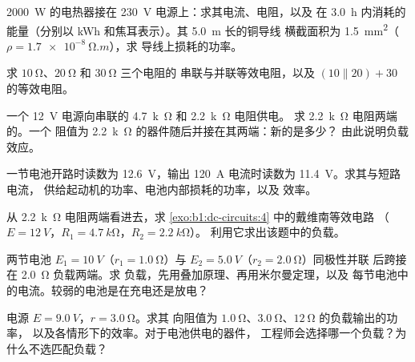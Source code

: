 \begin{exercise}[$\star$]\label{exo:b1:dc-circuits:2}
\qty{2000}{W} 的电热器接在 \qty{230}{V} 电源上：求其电流、电阻，以及
在 \qty{3.0}{h} 内消耗的能量（分别以 kWh 和焦耳表示）。其 \qty{5.0}{m} 长的铜导线
横截面积为 \qty{1.5}{mm^2}（$\rho = \qty{1.7e-8}{\ohm.m}$），求
导线上损耗的功率。
\end{exercise}

\begin{exercise}[$\star$]\label{exo:b1:dc-circuits:3}
求 $\qty{10}{\ohm}$、$\qty{20}{\ohm}$ 和 $\qty{30}{\ohm}$ 三个电阻的
串联与并联等效电阻，以及
$(10 \parallel 20) + 30$ 的等效电阻。
\end{exercise}

\begin{exercise}[$\star$]\label{exo:b1:dc-circuits:4}
一个 \qty{12}{V} 电源向串联的 \qty{4.7}{k\ohm} 和 \qty{2.2}{k\ohm} 电阻供电。
求 \qty{2.2}{k\ohm} 电阻两端的。一个
阻值为 \qty{2.2}{k\ohm} 的器件随后并接在其两端：新的是多少？
由此说明负载效应。
\end{exercise}

\begin{exercise}[$\star\star$]\label{exo:b1:dc-circuits:5}
一节电池开路时读数为 \qty{12.6}{V}，输出
\qty{120}{A} 电流时读数为 \qty{11.4}{V}。求其与短路电流，
供给起动机的功率、电池内部损耗的功率，以及
效率。
\end{exercise}

\begin{exercise}[$\star\star$]\label{exo:b1:dc-circuits:6}
从 \qty{2.2}{k\ohm} 电阻两端看进去，求
\cref{exo:b1:dc-circuits:4} 中的戴维南等效电路
（$E = \qty{12}{V}$，$R_1 = \qty{4.7}{k\ohm}$，$R_2 = \qty{2.2}{k\ohm}$）。
利用它求出该题中的负载。
\end{exercise}

\begin{exercise}[$\star\star$]\label{exo:b1:dc-circuits:7}
两节电池 $E_1 = \qty{10}{V}$（$r_1 = \qty{1.0}{\ohm}$）与
$E_2 = \qty{5.0}{V}$（$r_2 = \qty{2.0}{\ohm}$）同极性并联
后跨接在 \qty{2.0}{\ohm} 负载两端。求
负载，先用叠加原理、再用米尔曼定理，以及
每节电池中的电流。较弱的电池是在充电还是放电？
\end{exercise}

\begin{exercise}[$\star\star$]\label{exo:b1:dc-circuits:8}
电源 $E = \qty{9.0}{V}$，$r = \qty{3.0}{\ohm}$。求其
向阻值为 $\qty{1.0}{\ohm}$、$\qty{3.0}{\ohm}$、$\qty{12}{\ohm}$ 的负载输出的功率，
以及各情形下的效率。对于电池供电的器件，
工程师会选择哪一个负载？为什么不选匹配负载？
\end{exercise}

